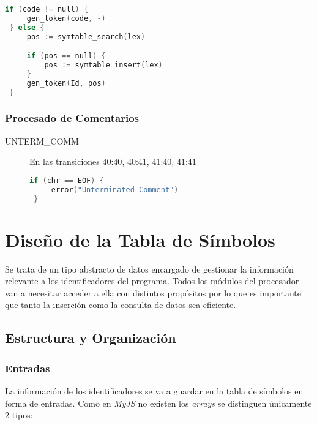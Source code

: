 \documentclass[a4paper]{CSMakotoTechnicalReport}
\begin{document}
\begin{minipage}{\textwidth}
\begin{multicols}{2}
\begin{description}
\begin{lstlisting}[language=C]
 if (code != null) {
     gen_token(code, -)
 } else {
     pos := symtable_search(lex)

     if (pos == null) {
         pos := symtable_insert(lex)
     }
     gen_token(Id, pos)
 }
            \end{lstlisting}

    \end{description}
    \end{multicols}

    \subsubsection{Procesado de Comentarios}

    \begin{description}
        \item[UNTERM\_COMM] En las transiciones $40$:$40$, $40$:$41$, $41$:$40$, $41$:$41$
            \begin{lstlisting}[language=C]
 if (chr == EOF) {
     error("Unterminated Comment")
 }
            \end{lstlisting}
    \end{description}
    \end{minipage}

    \section{Diseño de la Tabla de Símbolos}

    Se trata de un tipo abstracto de datos encargado de gestionar la información relevante a los identificadores del programa. Todos los módulos del procesador van a necesitar acceder a ella con distintos propósitos por lo que es importante que tanto la inserción como la consulta de datos sea eficiente.

    \subsection{Estructura y Organización}

    \subsubsection{Entradas}

    La información de los identificadores se va a guardar en la tabla de símbolos en forma de entradas. Como en \textit{MyJS} no existen los \textit{arrays} se distinguen únicamente 2 tipos:
\end{document}
